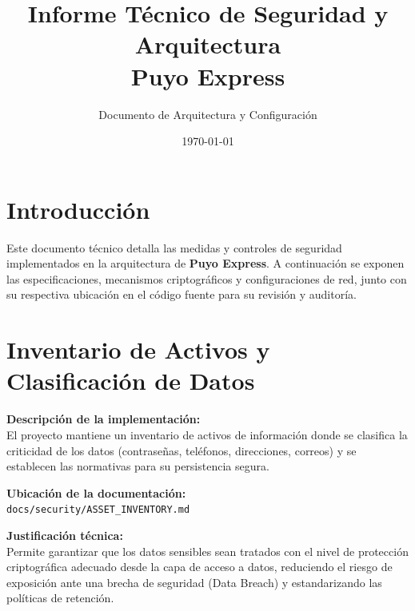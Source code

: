 \documentclass[12pt,a4paper]{article}
\title{\textbf{Informe Técnico de Seguridad y Arquitectura} \\ \Large Puyo Express}
\author{Documento de Arquitectura y Configuración}
\date{\today}
\begin{document}
\maketitle

\section*{Introducción}
Este documento técnico detalla las medidas y controles de seguridad implementados en la arquitectura de \textbf{Puyo Express}. A continuación se exponen las especificaciones, mecanismos criptográficos y configuraciones de red, junto con su respectiva ubicación en el código fuente para su revisión y auditoría.

\section{Inventario de Activos y Clasificación de Datos}
\textbf{Descripción de la implementación:}\\
El proyecto mantiene un inventario de activos de información donde se clasifica la criticidad de los datos (contraseñas, teléfonos, direcciones, correos) y se establecen las normativas para su persistencia segura.

\noindent\textbf{Ubicación de la documentación:}\\
\texttt{docs/security/ASSET\_INVENTORY.md}

\noindent\textbf{Justificación técnica:}\\
Permite garantizar que los datos sensibles sean tratados con el nivel de protección criptográfica adecuado desde la capa de acceso a datos, reduciendo el riesgo de exposición ante una brecha de seguridad (Data Breach) y estandarizando las políticas de retención.
\end{document}
